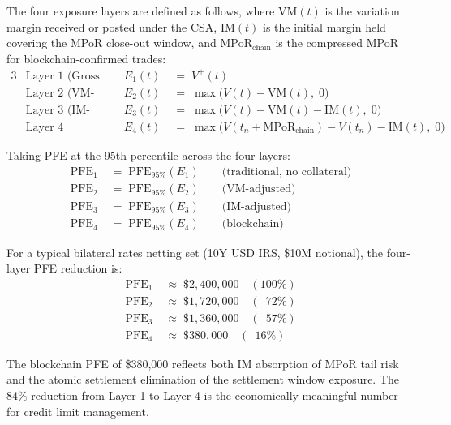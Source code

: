 \documentclass[12pt,letterpaper]{article}
\numberwithin{equation}{section}
\theoremstyle{remark}
\newcommand{\MPoR}{\mathrm{MPoR}}
\newcommand{\PFE}{\mathrm{PFE}}
\begin{document}
The four exposure layers are defined as follows, where $\mathrm{VM}(t)$ is
the variation margin received or posted under the CSA, $\mathrm{IM}(t)$ is
the initial margin held covering the MPoR close-out window, and
$\MPoR_{\text{chain}}$ is the compressed MPoR for blockchain-confirmed trades:
\begin{alignat}{3}
  &\text{Layer 1 (Gross MTM):}\qquad
    &E_1(t) &\;=\; V^+(t)
    \label{eq:layer1}\\
  &\text{Layer 2 (VM-adjusted):}\qquad
    &E_2(t) &\;=\; \max\bigl(V(t) - \mathrm{VM}(t),\; 0\bigr)
    \label{eq:layer2}\\
  &\text{Layer 3 (IM-adjusted):}\qquad
    &E_3(t) &\;=\; \max\bigl(V(t) - \mathrm{VM}(t) - \mathrm{IM}(t),\; 0\bigr)
    \label{eq:layer3}\\
  &\text{Layer 4 (Blockchain):}\qquad
    &E_4(t) &\;=\; \max\bigl(V(t_n + \MPoR_{\text{chain}})
    - V(t_n) - \mathrm{IM}(t),\; 0\bigr)
    \label{eq:layer4}
\end{alignat}

Taking PFE at the 95th percentile across the four layers:
\begin{align}
  \PFE_1 &\;=\; \PFE_{95\%}(E_1) \qquad\text{(traditional, no collateral)}
  \label{eq:pfe1}\\
  \PFE_2 &\;=\; \PFE_{95\%}(E_2) \qquad\text{(VM-adjusted)}
  \label{eq:pfe2}\\
  \PFE_3 &\;=\; \PFE_{95\%}(E_3) \qquad\text{(IM-adjusted)}
  \label{eq:pfe3}\\
  \PFE_4 &\;=\; \PFE_{95\%}(E_4) \qquad\text{(blockchain)}
  \label{eq:pfe4}
\end{align}

For a typical bilateral rates netting set (10Y USD IRS, \$10M notional),
the four-layer PFE reduction is:
\begin{align}
  \PFE_1 &\;\approx\; \$2{,}400{,}000 \quad (100\%) \label{eq:pfe1val}\\
  \PFE_2 &\;\approx\; \$1{,}720{,}000 \quad (\phantom{0}72\%)
    \label{eq:pfe2val}\\
  \PFE_3 &\;\approx\; \$1{,}360{,}000 \quad (\phantom{0}57\%)
    \label{eq:pfe3val}\\
  \PFE_4 &\;\approx\; \$380{,}000     \quad (\phantom{0}16\%)
    \label{eq:pfenumbers}
\end{align}

The blockchain PFE of \$380,000 reflects both IM absorption of MPoR tail
risk and the atomic settlement elimination of the settlement window
exposure. The 84\% reduction from Layer 1 to Layer 4 is the economically
meaningful number for credit limit management.
\end{document}
